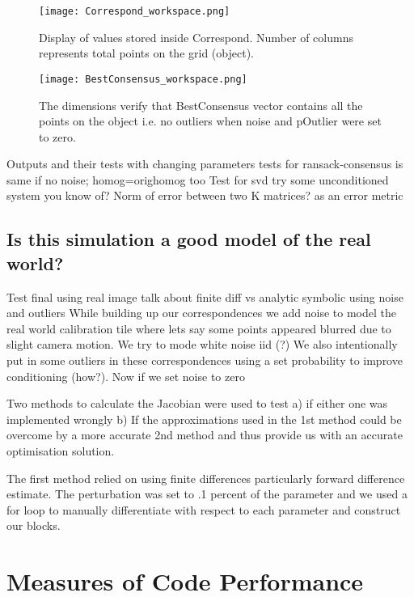 \documentclass[titlepage]{article}
\begin{document}
\begin{wrapfigure}{r}{5.5cm}
\caption{Display of values stored inside Correspond. Number of columns represents total points on the grid (object).}\label{wrap-fig:1}
\texttt{[image: Correspond\_workspace.png]}
\end{wrapfigure} 

\begin{wrapfigure}{r}{5.5cm}
\caption{The dimensions verify that BestConsensus vector contains all the points on the object i.e. no outliers when noise and pOutlier were set to zero.}\label{wrap-fig:1}
\texttt{[image: BestConsensus\_workspace.png]}
\end{wrapfigure} 

Outputs and their tests with changing parameters
tests for ransack-consensus is same if no noise; homog=orighomog too
Test for svd try some unconditioned system you know of?
Norm of error between two K matrices? as an error metric

\subsection{Is this simulation a good model of the real world?}

Test final using real image
talk about finite diff vs analytic symbolic
using noise and outliers
While building up our correspondences we add noise to model the real world calibration tile where lets say some points appeared blurred due to slight camera motion. We try to mode white noise iid (?)
We also intentionally put in some outliers in these correspondences using a set probability to improve conditioning (how?).
Now if we set noise to zero 

Two methods to calculate the Jacobian were used to test a) if either one was implemented wrongly b) If the approximations used in the 1st method could be overcome by a more accurate 2nd method and thus provide us with an accurate optimisation solution.

The first method relied on using finite differences particularly forward difference estimate. The perturbation was set to .1 percent of the parameter and we used a for loop to manually differentiate with respect to each parameter and construct our blocks.

\section{Measures of Code Performance}
\end{document}
